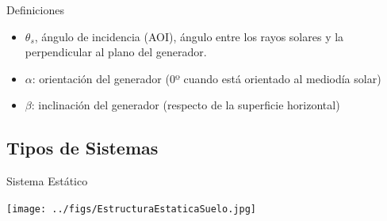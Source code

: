 \documentclass[xcolor={usenames,svgnames,dvipsnames}]{beamer}
\begin{document}
\begin{frame}[label={sec:org8b85611}]{Definiciones}
\begin{itemize}
\item \(\theta_s\), \alert{ángulo de incidencia (AOI)}, ángulo entre los rayos solares y la perpendicular al plano del generador.
\item \(\alpha\): \alert{orientación del generador} (0º cuando está orientado al mediodía solar)
\item \(\beta\): \alert{inclinación del generador} (respecto de la superficie horizontal)
\end{itemize}
\end{frame}
\subsection{Tipos de Sistemas}
\label{sec:orga97d496}
\begin{frame}[label={sec:orgbf1273f}]{Sistema Estático}
\begin{center}
\texttt{[image: ../figs/EstructuraEstaticaSuelo.jpg]}
\end{center}
\end{frame}
\end{document}
